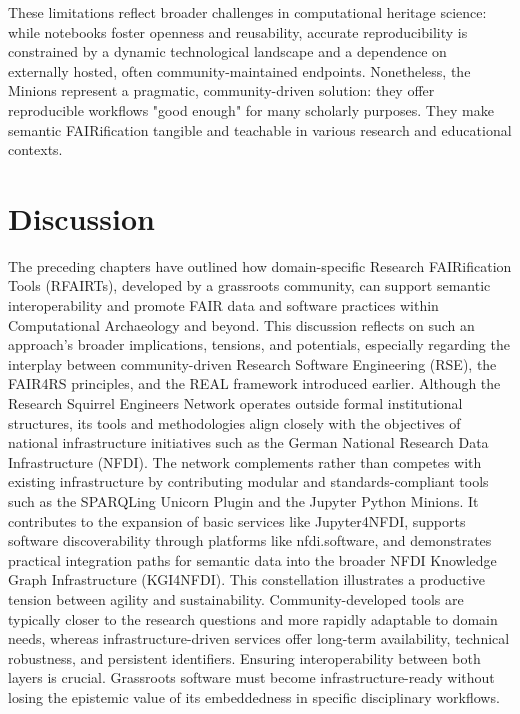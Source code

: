 \documentclass{eceasst}
\begin{document}
These limitations reflect broader challenges in computational heritage science: while notebooks foster openness and reusability, accurate reproducibility is constrained by a dynamic technological landscape and a dependence on externally hosted, often community-maintained endpoints. Nonetheless, the Minions represent a pragmatic, community-driven solution: they offer reproducible workflows "good enough" for many scholarly purposes. They make semantic FAIRification tangible and teachable in various research and educational contexts.

\section{Discussion}\label{sec:discussion}

The preceding chapters have outlined how domain-specific Research FAIRification Tools (RFAIRTs), developed by a grassroots community, can support semantic interoperability and promote FAIR data and software practices within Computational Archaeology and beyond. This discussion reflects on such an approach's broader implications, tensions, and potentials, especially regarding the interplay between community-driven Research Software Engineering (RSE), the FAIR4RS principles, and the REAL framework introduced earlier. Although the Research Squirrel Engineers Network operates outside formal institutional structures, its tools and methodologies align closely with the objectives of national infrastructure initiatives such as the German National Research Data Infrastructure (NFDI). The network complements rather than competes with existing infrastructure by contributing modular and standards-compliant tools such as the SPARQLing Unicorn Plugin and the Jupyter Python Minions. It contributes to the expansion of basic services like Jupyter4NFDI, supports software discoverability through platforms like nfdi.software, and demonstrates practical integration paths for semantic data into the broader NFDI Knowledge Graph Infrastructure (KGI4NFDI). This constellation illustrates a productive tension between agility and sustainability. Community-developed tools are typically closer to the research questions and more rapidly adaptable to domain needs, whereas infrastructure-driven services offer long-term availability, technical robustness, and persistent identifiers. Ensuring interoperability between both layers is crucial. Grassroots software must become infrastructure-ready without losing the epistemic value of its embeddedness in specific disciplinary workflows.
\end{document}
